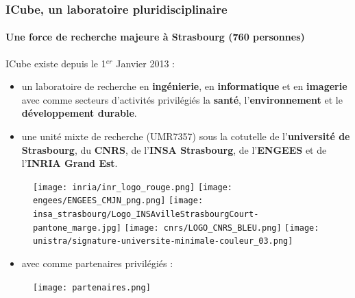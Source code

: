 \begin{frame}
    \frametitle{ICube, un laboratoire pluridisciplinaire}
    \framesubtitle{Une force de recherche majeure à Strasbourg (760 personnes)}
    ICube existe depuis le 1$^{er}$ Janvier 2013 :
        \begin{itemize}
            \item un laboratoire de recherche en \textbf{ingénierie}, en \textbf{informatique} et en \textbf{imagerie} avec comme secteurs d'activités privilégiés la \textbf{santé}, l'\textbf{environnement} et le \textbf{développement durable}.
        \end{itemize}
        \begin{center}
        \end{center}
        \begin{itemize}
            \item une unité mixte de recherche (UMR7357) sous la cotutelle de l’\textbf{université de Strasbourg}, du \textbf{CNRS}, de l’\textbf{INSA Strasbourg}, de l’\textbf{ENGEES} et de l’\textbf{INRIA Grand Est}.
        \end{itemize}
    \begin{figure}[!h]
        \centering
            \texttt{[image: inria/inr\_logo\_rouge.png]}
            \texttt{[image: engees/ENGEES\_CMJN\_png.png]}
            \texttt{[image: insa\_strasbourg/Logo\_INSAvilleStrasbourgCourt-pantone\_marge.jpg]}
            \texttt{[image: cnrs/LOGO\_CNRS\_BLEU.png]}
            \texttt{[image: unistra/signature-universite-minimale-couleur\_03.png]}
    \end{figure}
    \begin{itemize}
        \item avec comme partenaires privilégiés :
    \end{itemize}
    \begin{figure}[!h]
        \centering
            \texttt{[image: partenaires.png]}
    \end{figure}    
\end{frame}